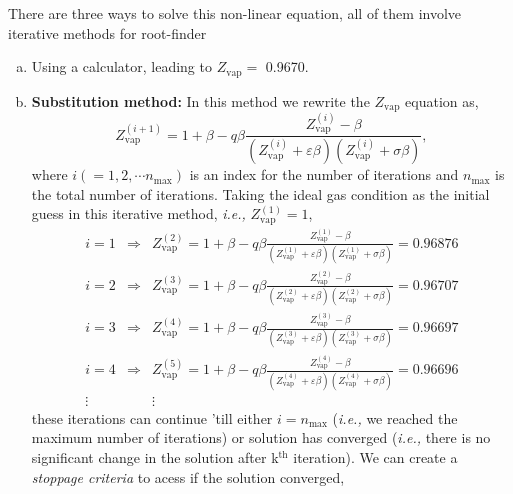 \documentclass[12pts,a4paper,amsmath,amssymb,floatfix]{article}%
\newcommand{\frc}{\displaystyle\frac}
\newcommand{\ie}{{\it i.e., }}
\begin{document}
\begin{enumerate}[1)]
           There are three ways to solve this non-linear equation, all of them involve iterative methods for root-finder
           \begin{enumerate}[a)]
%
              \item Using a calculator, leading to $Z_{\text{vap}} = $ 0.9670. 
%
              \item {\bf Substitution method:} In this method we rewrite the $Z_{\text{vap}}$ equation as,
                 \begin{displaymath}
                     Z_{\text{vap}}^{(i+1)} = 1 + \beta - q\beta \frc{Z_{\text{vap}}^{(i)} - \beta} {\left(Z_{\text{vap}}^{(i)}+\varepsilon\beta\right)\left(Z_{\text{vap}}^{(i)} +\sigma\beta\right)},
                 \end{displaymath}
                 where $i(=1, 2, \cdots n_{\text{max}})$ is an index for the number of iterations and $n_{\text{max}}$ is the total number of iterations. Taking the ideal gas condition as the initial guess in this iterative method, \ie $Z_{\text{vap}}^{(1)}=1$, 
                 \begin{eqnarray}
                    i=1 &\Rightarrow& Z_{\text{vap}}^{(2)} = 1 + \beta - q\beta \frc{Z_{\text{vap}}^{(1)} - \beta} {\left(Z_{\text{vap}}^{(1)}+\varepsilon\beta\right)\left(Z_{\text{vap}}^{(1)} +\sigma\beta\right)} = 0.96876 \nonumber \\
                    i=2 &\Rightarrow& Z_{\text{vap}}^{(3)} = 1 + \beta - q\beta \frc{Z_{\text{vap}}^{(2)} - \beta} {\left(Z_{\text{vap}}^{(2)}+\varepsilon\beta\right)\left(Z_{\text{vap}}^{(2)} +\sigma\beta\right)} = 0.96707 \nonumber \\
                    i=3 &\Rightarrow& Z_{\text{vap}}^{(4)} = 1 + \beta - q\beta \frc{Z_{\text{vap}}^{(3)} - \beta} {\left(Z_{\text{vap}}^{(3)}+\varepsilon\beta\right)\left(Z_{\text{vap}}^{(3)} +\sigma\beta\right)} = 0.96697 \nonumber \\
                    i=4 &\Rightarrow& Z_{\text{vap}}^{(5)} = 1 + \beta - q\beta \frc{Z_{\text{vap}}^{(4)} - \beta} {\left(Z_{\text{vap}}^{(4)}+\varepsilon\beta\right)\left(Z_{\text{vap}}^{(4)} +\sigma\beta\right)} = 0.96696 \nonumber \\
                    \vdots && \vdots \nonumber
                 \end{eqnarray}
                 these iterations can continue 'till either $i=n_{\text{max}}$ (\ie we reached the maximum number of iterations) or solution has converged (\ie there is no significant change in the solution after k$^{\text{th}}$ iteration). We can create a {\it stoppage criteria} to acess if the solution converged,

\end{enumerate}
\end{enumerate}
\end{document}
